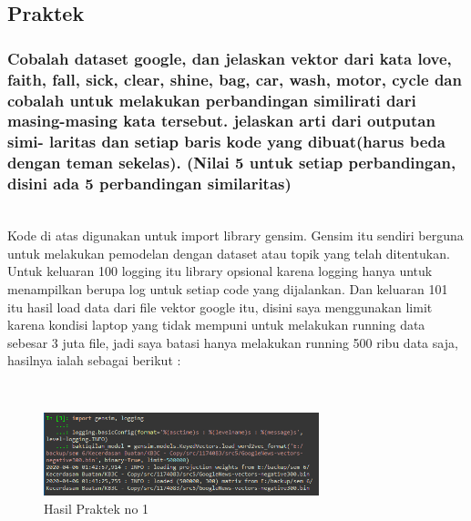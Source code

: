 \subsection{Praktek}
\subsubsection{Cobalah dataset google, dan jelaskan vektor dari kata love, faith, fall, sick, clear, shine, bag, car, wash, motor, cycle dan cobalah untuk melakukan perbandingan similirati dari masing-masing kata tersebut. jelaskan arti dari outputan simi- laritas dan setiap baris kode yang dibuat(harus beda dengan teman sekelas). (Nilai 5 untuk setiap perbandingan, disini ada 5 perbandingan similaritas)}
\hfill\\
Kode di atas digunakan untuk import library gensim. Gensim itu sendiri berguna untuk melakukan pemodelan dengan dataset atau topik yang telah ditentukan. Untuk keluaran 100 logging itu library opsional karena logging hanya untuk menampilkan berupa log untuk setiap code yang dijalankan. Dan keluaran 101 itu hasil load data dari file vektor google itu, disini saya menggunakan limit karena kondisi laptop yang tidak mempuni untuk melakukan running data sebesar 3 juta file, jadi saya batasi hanya melakukan running 500 ribu data saja, hasilnya ialah sebagai berikut :

\hfill\\
\begin{figure}[H]
	\centering
	\includegraphics[width=8cm]{figures/1174083/figures5/7.png}
	\caption{Hasil Praktek no 1}
\end{figure}

